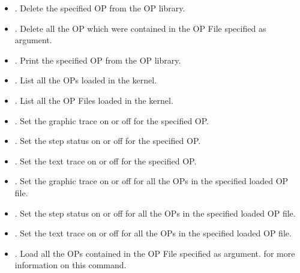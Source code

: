 \begin{itemize}

\item {}. Delete the specified OP from the OP
library. 

\item {}. Delete all the OP which
were contained in the OP File specified as argument.

\item {}. Print the specified OP from the OP
library.

\item {}. List all the OPs loaded in the kernel.

\item {}. List all the OP Files loaded in the kernel.

\item {}. Set the graphic
trace on or off for the specified OP.

\item {}. Set the step
status on or off for the specified OP.

\item {}. Set the text trace
on or off for the specified OP.

\item {}. Set the
graphic trace on or off for all the OPs in the specified loaded OP file.

\item {}. Set the
step status on or off for all the OPs in the specified loaded OP file.

\item {}. Set the text
trace on or off for all the OPs in the specified loaded OP file.

\item {}.  Load all the OPs contained in the
OP File specified as argument.  for more
information on this command.


\end{itemize}
